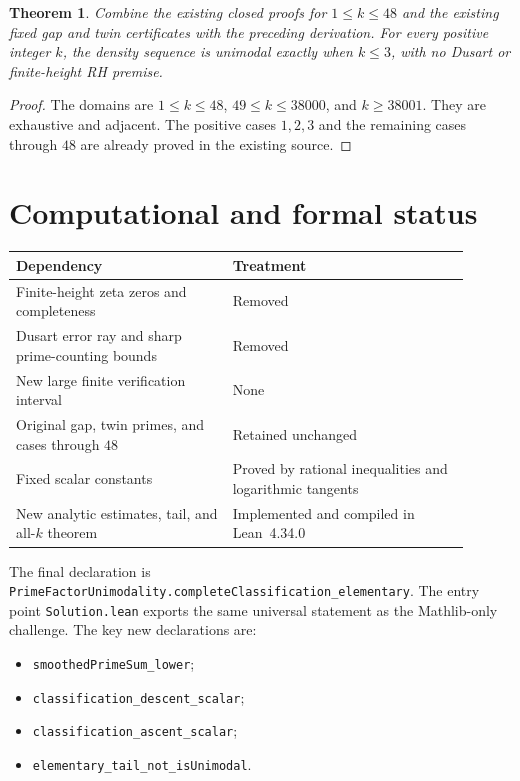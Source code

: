 \documentclass[11pt]{article}
\newtheorem{theorem}{Theorem}
\begin{document}
\begin{theorem}
Combine the existing closed proofs for $1\le k\le48$ and the existing
fixed gap and twin certificates with the preceding derivation.
For every positive integer $k$, the density sequence is unimodal exactly
when $k\le3$, with no Dusart or finite-height RH premise.
\end{theorem}
\begin{proof}
The domains are $1\le k\le48$, $49\le k\le38000$, and $k\ge38001$.
They are exhaustive and adjacent. The positive cases $1,2,3$ and the
remaining cases through $48$ are already proved in the existing source.
\end{proof}

\section{Computational and formal status}
\begin{center}\small
\begin{tabular}{p{0.43\linewidth}p{0.47\linewidth}}
\hline
Dependency & Treatment\\ \hline
Finite-height zeta zeros and completeness & Removed\\
Dusart error ray and sharp prime-counting bounds & Removed\\
New large finite verification interval & None\\
Original gap, twin primes, and cases through $48$ & Retained unchanged\\
Fixed scalar constants & Proved by rational inequalities and logarithmic tangents\\
New analytic estimates, tail, and all-$k$ theorem & Implemented and compiled in Lean~4.34.0\\ \hline
\end{tabular}
\end{center}
The final declaration is
\texttt{PrimeFactorUnimodality.}\allowbreak\texttt{completeClassification\_elementary}.
The entry point \texttt{Solution.lean} exports the same universal statement
as the Mathlib-only challenge. The key new declarations are:
\begin{itemize}
\item \texttt{smoothedPrimeSum\_lower};
\item \texttt{classification\_descent\_scalar};
\item \texttt{classification\_ascent\_scalar};
\item \texttt{elementary\_tail\_not\_isUnimodal}.
\end{itemize}
\end{document}
